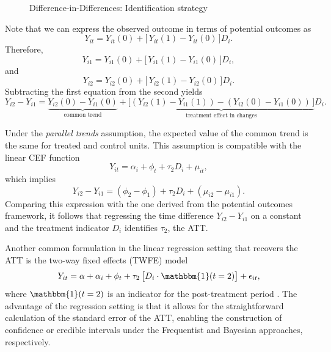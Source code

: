 \begin{figure}[ht]
	\caption{Difference-in-Differences: Identification strategy}
	\label{Fig:DiD}
\end{figure}

Note that we can express the observed outcome in terms of potential outcomes as
\[
Y_{it} = Y_{it}(0) + \big[\,Y_{it}(1) - Y_{it}(0)\,\big] D_i.
\]
Therefore,
\[
Y_{i1} = Y_{i1}(0) + \big[\,Y_{i1}(1) - Y_{i1}(0)\,\big] D_i,
\]
and
\[
Y_{i2} = Y_{i2}(0) + \big[\,Y_{i2}(1) - Y_{i2}(0)\,\big] D_i.
\]
Subtracting the first equation from the second yields
\[
Y_{i2} - Y_{i1} = \underbrace{Y_{i2}(0) - Y_{i1}(0)}_{\text{common trend}} 
+ \underbrace{\big[(Y_{i2}(1) - Y_{i1}(1)) - (Y_{i2}(0) - Y_{i1}(0))\,\big]}_{\text{treatment effect in changes}} D_i.
\]

Under the \emph{parallel trends} assumption, the expected value of the common trend is the same for treated and control units. This assumption is compatible with the linear CEF function
\[
Y_{it} = \alpha_i + \phi_t + \tau_2 D_i + \mu_{it},
\]
which implies
\[
Y_{i2} - Y_{i1} = (\phi_2 - \phi_1) + \tau_2 D_i + (\mu_{i2} - \mu_{i1}).
\]
Comparing this expression with the one derived from the potential outcomes framework, it follows that regressing the time difference $Y_{i2} - Y_{i1}$ on a constant and the treatment indicator $D_i$ identifies $\tau_2$, the ATT.

Another common formulation in the linear regression setting that recovers the ATT is the two-way fixed effects (TWFE) model
\[
Y_{it} = \alpha + \alpha_i + \phi_t + \tau_2 \,\big[ D_i \cdot \mathbbm{1}(t = 2) \big] + \epsilon_{it},
\]
where $\mathbbm{1}(t = 2)$ is an indicator for the post-treatment period \cite{roth2023whats}. The advantage of the regression setting is that it allows for the straightforward calculation of the standard error of the ATT, enabling the construction of confidence or credible intervals under the Frequentist and Bayesian approaches, respectively.

